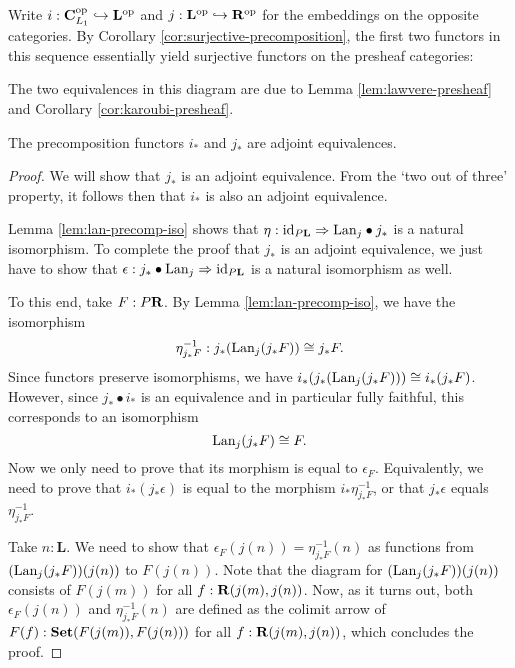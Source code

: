 Write $ i: \mathbf{C}_{L_1}^{\text{op}} \hookrightarrow \mathbf L^{\text{op}} $ and $ j: \mathbf L^{\text{op}} \hookrightarrow \mathbf{R}^{\text{op}} $ for the embeddings on the opposite categories. By Corollary \ref{cor:surjective-precomposition}, the first two functors in this sequence essentially yield surjective functors on the presheaf categories:
\begin{center}
\end{center}
The two equivalences in this diagram are due to Lemma \ref{lem:lawvere-presheaf} and Corollary \ref{cor:karoubi-presheaf}.

\begin{lemma}\label{lem:equivalent-presheaf-cats}
  The precomposition functors $ i_* $ and $ j_* $ are adjoint equivalences.
\end{lemma}
\begin{proof}
  We will show that $ j_* $ is an adjoint equivalence. From the `two out of three' property, it follows then that $ i_* $ is also an adjoint equivalence.

  Lemma \ref{lem:lan-precomp-iso} shows that $ \eta: \text{id}_{P \mathbf L} \Rightarrow \text{Lan}_{j} \bullet j_* $ is a natural isomorphism. To complete the proof that $ j_* $ is an adjoint equivalence, we just have to show that $ \epsilon: j_* \bullet \text{Lan}_{j} \Rightarrow \text{id}_{P \mathbf L} $ is a natural isomorphism as well.

  To this end, take $ F : P \mathbf{R} $. By Lemma \ref{lem:lan-precomp-iso}, we have the isomorphism
  \[ \eta^{-1}_{j_* F}: j_* (\text{Lan}_{j}(j_* F)) \cong j_* F. \]
  Since functors preserve isomorphisms, we have $ i_* (j_* (\text{Lan}_{j}(j_* F))) \cong i_* (j_* F) $. However, since $ j_* \bullet i_* $ is an equivalence and in particular fully faithful, this corresponds to an isomorphism
  \[ \text{Lan}_{j}(j_* F) \cong F. \]
  Now we only need to prove that its morphism is equal to $ \epsilon_F $. Equivalently, we need to prove that $ i_* (j_* \epsilon) $ is equal to the morphism $ i_* \eta_{j_* F}^{-1} $, or that $ j_* \epsilon $ equals $ \eta^{-1}_{j_* F} $.

  Take $ n : \mathbf L $. We need to show that $ \epsilon_F (j(n)) = \eta_{j_* F}^{-1}(n) $ as functions from $ (\text{Lan}_{j} (j_* F)) (j(n)) $ to $ F(j(n)) $. Note that the diagram for $ (\text{Lan}_{j} (j_* F)) (j(n)) $ consists of $ F(j(m)) $ for all $ f: \mathbf{R}(j(m), j(n)) $. Now, as it turns out, both $ \epsilon_F (j(n)) $ and $ \eta_{j_* F}^{-1}(n) $ are defined as the colimit arrow of $ F(f) : \mathbf{Set}(F(j(m)), F(j(n))) $ for all $ f: \mathbf{R}(j(m), j(n)) $, which concludes the proof.
\end{proof}

